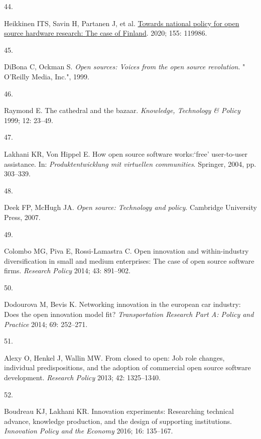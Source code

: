 \documentclass[
  12pt,
  a4paperpaper,
  onecolumn]{article}
\newlength{\cslhangindent}
\newlength{\csllabelwidth}
\newlength{\cslentryspacingunit} %
\newenvironment{CSLReferences}[2] %
 {%
  \setlength{\parindent}{0pt}
  \ifodd #1
  \let\oldpar\par
  \def\par{\hangindent=\cslhangindent\oldpar}
  \fi
  \setlength{\parskip}{#2\cslentryspacingunit}
 }%
 {}
\newcommand{\CSLLeftMargin}[1]{\parbox[t]{\csllabelwidth}{#1}}
\newcommand{\CSLRightInline}[1]{\parbox[t]{\linewidth - \csllabelwidth}{#1}\break}
\begin{document}
\begin{CSLReferences}{0}{0}
\leavevmode{}%
\CSLLeftMargin{44. }%
\CSLRightInline{Heikkinen ITS, Savin H, Partanen J, et al.
\href{https://doi.org/10.1016/j.techfore.2020.119986}{Towards national
policy for open source hardware research: {The} case of {Finland}}.
2020; 155: 119986.}

\leavevmode{}%
\CSLLeftMargin{45. }%
\CSLRightInline{DiBona C, Ockman S. \emph{Open sources: Voices from the
open source revolution}. " O'Reilly Media, Inc.", 1999.}

\leavevmode{}%
\CSLLeftMargin{46. }%
\CSLRightInline{Raymond E. The cathedral and the bazaar.
\emph{Knowledge, Technology \& Policy} 1999; 12: 23--49.}

\leavevmode{}%
\CSLLeftMargin{47. }%
\CSLRightInline{Lakhani KR, Von Hippel E. How open source software
works:{`free'} user-to-user assistance. In: \emph{Produktentwicklung mit
virtuellen communities}. Springer, 2004, pp. 303--339.}

\leavevmode{}%
\CSLLeftMargin{48. }%
\CSLRightInline{Deek FP, McHugh JA. \emph{Open source: Technology and
policy}. Cambridge University Press, 2007.}

\leavevmode{}%
\CSLLeftMargin{49. }%
\CSLRightInline{Colombo MG, Piva E, Rossi-Lamastra C. Open innovation
and within-industry diversification in small and medium enterprises: The
case of open source software firms. \emph{Research Policy} 2014; 43:
891--902.}

\leavevmode{}%
\CSLLeftMargin{50. }%
\CSLRightInline{Dodourova M, Bevis K. Networking innovation in the
european car industry: Does the open innovation model fit?
\emph{Transportation Research Part A: Policy and Practice} 2014; 69:
252--271.}

\leavevmode{}%
\CSLLeftMargin{51. }%
\CSLRightInline{Alexy O, Henkel J, Wallin MW. From closed to open: Job
role changes, individual predispositions, and the adoption of commercial
open source software development. \emph{Research Policy} 2013; 42:
1325--1340.}

\leavevmode{}%
\CSLLeftMargin{52. }%
\CSLRightInline{Boudreau KJ, Lakhani KR. Innovation experiments:
Researching technical advance, knowledge production, and the design of
supporting institutions. \emph{Innovation Policy and the Economy} 2016;
16: 135--167.}


\end{CSLReferences}
\end{document}
